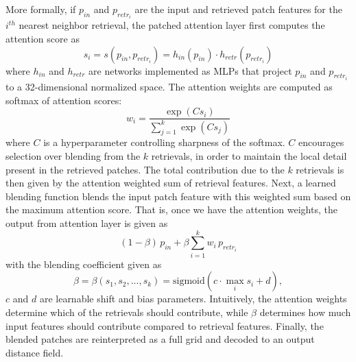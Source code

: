 More formally, if $p_{in}$ and $p_{retr_i}$ are the input and retrieved patch features for the $i^{th}$ nearest neighbor retrieval, the patched attention layer first computes the attention score as
\begin{equation}
    s_i = s(p_{in}, p_{retr_i}) = h_{in}(p_{in}) \cdot h_{retr}(p_{retr_i})
\end{equation} where $h_{in}$ and $h_{retr}$ are networks implemented as MLPs that project $p_{in}$ and $p_{retr_i}$ to a 32-dimensional normalized space.
%
The attention weights are computed as softmax of attention scores:
\begin{equation}
    w_i = \frac{\exp(Cs_i)}{\sum_{j=1}^{k}\exp(Cs_j)}
\end{equation} where $C$ is a hyperparameter controlling sharpness of the softmax.
$C$ encourages selection over blending from the $k$ retrievals, in order to maintain the local detail present in the retrieved patches.
The total contribution due to the $k$ retrievals is then given by the attention weighted sum of retrieval features.
%
Next, a learned blending function blends the input patch feature with this weighted sum based on the maximum attention score.
%
That is, once we have the attention weights, the output from attention layer is given as 
\begin{equation}
    (1 - \beta)\,p_{in} + \beta\sum_{i=1}^{k}w_i\,p_{retr_i}
\end{equation} with the blending coefficient given as 
\begin{equation}
    \beta = \beta(s_1, s_2, ..., s_k) = \mathrm{sigmoid}(c\cdot\max_i s_i + d),
\end{equation} $c$ and $d$ are learnable shift and bias parameters. Intuitively, the attention weights determine which of the retrievals should contribute, while $\beta$ determines how much input features should contribute compared to retrieval features.
%
Finally, the blended patches are reinterpreted as a full grid and decoded to an output distance field.
%


